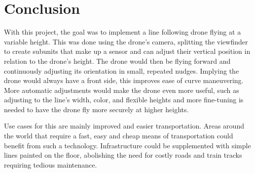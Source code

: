 \documentclass[a4paper, 10pt, conference]{IEEEtran}
\begin{document}
\section{Conclusion}
With this project, the goal was to implement a line following drone flying at a variable height. This was done using the drone’s camera, splitting the viewfinder to create subunits that make up a sensor and can adjust their vertical position in relation to the drone’s height. The drone would then be flying forward and continuously adjusting its orientation in small, repeated nudges. Implying the drone would always have a front side, this improves ease of curve maneuvering.
More automatic adjustments would make the drone even more useful, such as adjusting to the line’s width, color, and flexible heights and more fine-tuning is needed to have the drone fly more securely at higher heights.\\\par
Use cases for this are mainly improved and easier transportation. Areas around the world that require a fast, easy and cheap means of transportation could benefit from such a technology. Infrastructure could be supplemented with simple lines painted on the floor, abolishing the need for costly roads and train tracks requiring tedious maintenance.\\


\addtolength{\textheight}{-12cm}


  
\end{document}

